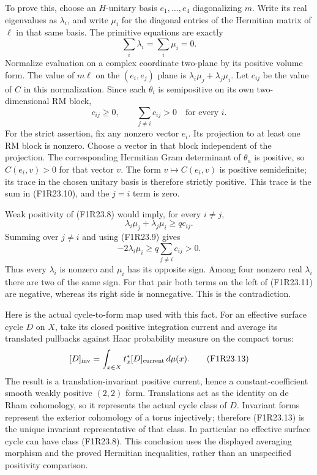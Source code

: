 To prove this, choose an $H$-unitary basis
$e_1,\ldots,e_4$ diagonalizing $m$. Write its real
eigenvalues as $\lambda_i$, and write $\mu_i$ for
the diagonal entries of the Hermitian matrix of
$\ell$ in that same basis. The primitive equations
are exactly
\[
                       \sum_i\lambda_i=\sum_i\mu_i=0.
 \tag{F1R23.9}
\]
Normalize evaluation on a complex coordinate
two-plane by its positive volume form. The value
of $m\ell$ on the $(e_i,e_j)$ plane is
$\lambda_i\mu_j+\lambda_j\mu_i$. Let $c_{ij}$
be the value of $C$ in this normalization. Since
each $\theta_i$ is semipositive on its own
two-dimensional RM block,
\[
                 c_{ij}\ge0,\qquad
                 \sum_{j\ne i}c_{ij}>0\quad\text{for every }i.
 \tag{F1R23.10}
\]
For the strict assertion, fix any nonzero vector
$e_i$. Its projection to at least one RM block is
nonzero. Choose a vector in that block independent
of the projection. The corresponding Hermitian
Gram determinant of $\theta_a$ is positive, so
$C(e_i,v)>0$ for that vector $v$. The form
$v\mapsto C(e_i,v)$ is positive semidefinite;
its trace in the chosen unitary basis is therefore
strictly positive. This trace is the sum in
(F1R23.10), and the $j=i$ term is zero.

Weak positivity of (F1R23.8) would imply, for every
$i\ne j$,
\[
                 \lambda_i\mu_j+\lambda_j\mu_i\ge q c_{ij}.
 \tag{F1R23.11}
\]
Summing over $j\ne i$ and using (F1R23.9) gives
\[
             -2\lambda_i\mu_i
                    \ge q\sum_{j\ne i}c_{ij}>0.
 \tag{F1R23.12}
\]
Thus every $\lambda_i$ is nonzero and $\mu_i$
has its opposite sign. Among four nonzero real
$\lambda_i$ there are two of the same sign. For
that pair both terms on the left of (F1R23.11)
are negative, whereas its right side is nonnegative.
This is the contradiction.

Here is the actual cycle-to-form map used with this
fact. For an effective surface cycle $D$ on $X$,
take its closed positive integration current and
average its translated pullbacks against Haar
probability measure on the compact torus:
\[
                 [D]_{\rm inv}
                       =\int_{x\in X}t_x^*[D]_{\rm current}\,d\mu(x).
 \tag{F1R23.13}
\]
The result is a translation-invariant positive
current, hence a constant-coefficient smooth
weakly positive $(2,2)$ form. Translations act
as the identity on de Rham cohomology, so it
represents the actual cycle class of $D$.
Invariant forms represent the exterior cohomology
of a torus injectively; therefore (F1R23.13)
is the unique invariant representative of that
class. In particular no effective surface cycle
can have class (F1R23.8). This conclusion uses
the displayed averaging morphism and the proved
Hermitian inequalities, rather than an unspecified
positivity comparison.

